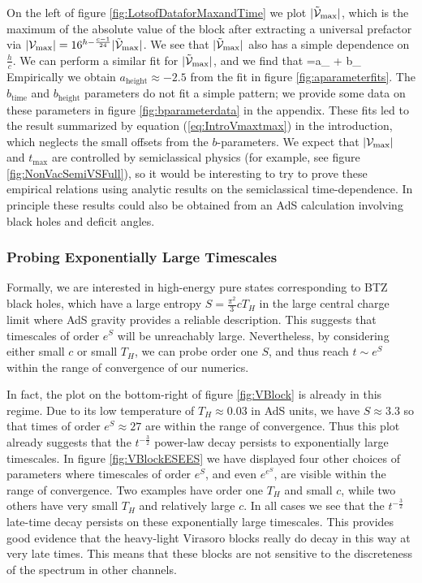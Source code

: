 On the left of figure \ref{fig:LotsofDataforMaxandTime} we plot $|\tilde {{\cal V}}_{\max}|$, which is the maximum of the absolute value of the block after extracting a universal prefactor via $|{\cal V}_{\max}| =16^{h - \frac{c-1}{24}} |\tilde {{\cal V}}_{\max}|$.  We see that $|\tilde {{\cal V}}_{\max}|$  also has a simple dependence on $\frac{h}{c}$.  We can perform a similar fit for $|\tilde{{\cal V}}_{\max}|$, and we find that
\be \label{eq:Vmaxdef}
  =a_{}  \log {} + b_{} 
\ee
Empirically we obtain $a_{\text{height}} \approx -2.5$ from the fit in figure \ref{fig:aparameterfits}.  The $b_{\text{time}}$ and $b_{\text{height}}$ parameters do not fit a simple pattern; we provide some data on these parameters in figure \ref{fig:bparameterdata} in the appendix.  These fits led to the result summarized by equation (\ref{eq:IntroVmaxtmax}) in the introduction, which neglects the small offsets from the $b$-parameters.  We expect that $|{\cal V}_{\text{max}}|$ and $t_{\text{max}}$ are controlled by semiclassical physics (for example, see figure \ref{fig:NonVacSemiVSFull}), so it would be interesting to try to prove these empirical relations using analytic results \cite{Fitzpatrick:2016mjq} on the semiclassical time-dependence.  In principle these results could also be obtained from an AdS calculation involving black holes and deficit angles.

\subsubsection{Probing Exponentially Large Timescales}

Formally, we are interested in high-energy pure states corresponding to BTZ black holes, which have a large entropy $S = \frac{\pi^2}{3} c T_H$ in the large central charge limit where AdS gravity provides a reliable description.  This suggests that timescales of order $e^S$ will be unreachably large.  Nevertheless, by considering either small $c$ or small $T_H$, we can probe order one $S$, and thus reach $t \sim e^S$ within the range of convergence of our numerics.  

In fact, the plot on the bottom-right of figure \ref{fig:VBlock} is already in this regime.  Due to its low temperature of $T_H \approx 0.03$ in AdS units, we have $S \approx 3.3$ so that times of order $e^S \approx 27$ are within the range of convergence.  Thus this plot already suggests that the $t^{-\frac{3}{2}}$ power-law decay persists to exponentially large timescales.  In figure \ref{fig:VBlockESEES} we have displayed four other choices of parameters where timescales of order $e^S$, and even $e^{e^S}$, are visible within the range of convergence.  Two examples have order one $T_H$ and small $c$, while two others have very small $T_H$ and relatively large $c$.  In all cases we see that the $t^{-\frac{3}{2}}$ late-time decay persists on these exponentially large timescales.  This provides good evidence that the heavy-light Virasoro blocks really do decay in this way at very late times.  This means that these blocks are not sensitive to the discreteness of the spectrum in other channels.

